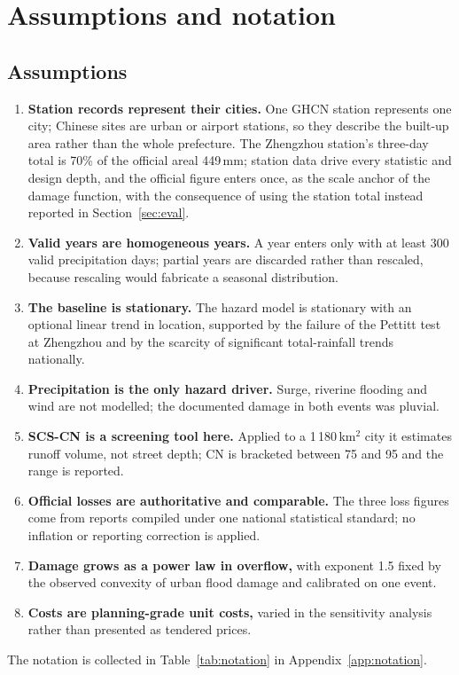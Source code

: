 \section{Assumptions and notation}\label{sec:assume}

\subsection{Assumptions}

\begin{enumerate}[leftmargin=1.5em,itemsep=1pt]
\item \textbf{Station records represent their cities.} One GHCN station represents one city; Chinese sites are urban or airport stations, so they describe the built-up area rather than the whole prefecture. The Zhengzhou station's three-day total is 70\% of the official areal 449\,mm; station data drive every statistic and design depth, and the official figure enters once, as the scale anchor of the damage function, with the consequence of using the station total instead reported in Section~\ref{sec:eval}.
\item \textbf{Valid years are homogeneous years.} A year enters only with at least 300 valid precipitation days; partial years are discarded rather than rescaled, because rescaling would fabricate a seasonal distribution.
\item \textbf{The baseline is stationary.} The hazard model is stationary with an optional linear trend in location, supported by the failure of the Pettitt test at Zhengzhou \cite{pettitt1979} and by the scarcity of significant total-rainfall trends nationally.
\item \textbf{Precipitation is the only hazard driver.} Surge, riverine flooding and wind are not modelled; the documented damage in both events was pluvial.
\item \textbf{SCS-CN is a screening tool here.} Applied to a 1\,180\,km$^2$ city it estimates runoff volume, not street depth; CN is bracketed between 75 and 95 and the range is reported.
\item \textbf{Official losses are authoritative and comparable.} The three loss figures come from reports compiled under one national statistical standard; no inflation or reporting correction is applied.
\item \textbf{Damage grows as a power law in overflow,} with exponent 1.5 fixed by the observed convexity of urban flood damage and calibrated on one event.
\item \textbf{Costs are planning-grade unit costs,} varied in the sensitivity analysis rather than presented as tendered prices.
\end{enumerate}

The notation is collected in Table~\ref{tab:notation} in Appendix~\ref{app:notation}.